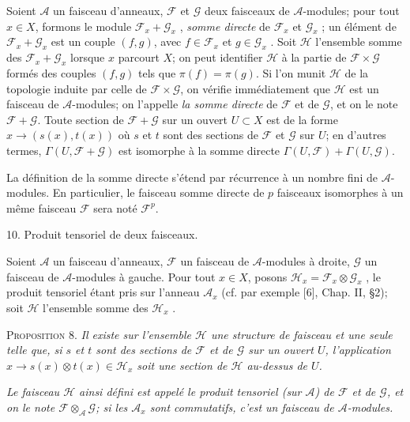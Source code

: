 Soient $\mathcal{A}$ un faisceau d'anneaux, $\mathcal{F}$ et $\mathcal{G}$ deux faisceaux de $\mathcal{A}$-modules; pour tout $x \in X$, formons le module $\mathcal{F}_x + \mathcal{G}_x$ , \textit{somme directe} de $\mathcal{F}_x$ et $\mathcal{G}_x$ ; un élément de $\mathcal{F}_x + \mathcal{G}_x$ est un couple $(f, g)$, avec $f \in \mathcal{F}_x$ et $g \in \mathcal{G}_x$ . Soit $\mathcal{H}$ l'ensemble somme des $\mathcal{F}_x + \mathcal{G}_x$ lorsque $x$ parcourt $X$; on peut identifier $\mathcal{H}$ à la partie de $\mathcal{F} \times \mathcal{G}$ formés des couples $(f, g)$ tels que $\pi(f) = \pi(g)$. Si l'on munit $\mathcal{H}$ de la topologie induite par celle de $\mathcal{F} \times \mathcal{G}$, on vérifie immédiatement que $\mathcal{H}$ est un faisceau de $\mathcal{A}$-modules; on l'appelle \textit{la somme directe} de $\mathcal{F}$ et de $\mathcal{G}$, et on le note $\mathcal{F} + \mathcal{G}$. Toute section de $\mathcal{F} + \mathcal{G}$ sur un ouvert $U \subset X$ est de la forme $x \to (s(x), t(x))$ où $s$ et $t$ sont des sections de $\mathcal{F}$ et $\mathcal{G}$ sur $U$; en d'autres termes, $\Gamma(U, \mathcal{F} + \mathcal{G})$ est isomorphe à la somme directe $\Gamma(U, \mathcal{F}) + \Gamma(U, \mathcal{G})$.

La définition de la somme directe s'étend par récurrence à un nombre fini de $\mathcal{A}$-modules. En particulier, le faisceau somme directe de $p$ faisceaux isomorphes à un même faisceau $\mathcal{F}$ sera noté $\mathcal{F}^p$.


10. Produit tensoriel de deux faisceaux.

Soient $\mathcal{A}$ un faisceau d'anneaux, $\mathcal{F}$ un faisceau de $\mathcal{A}$-modules à droite, $\mathcal{G}$ un faisceau de $\mathcal{A}$-modules à gauche. Pour tout $x \in X$, posons $\mathcal{H}_x = \mathcal{F}_x \otimes \mathcal{G}_x$ , le produit tensoriel étant pris sur l'anneau $\mathcal{A}_x$ (cf. par exemple [6], Chap. II, \S2); soit $\mathcal{H}$ l'ensemble somme des $\mathcal{H}_x$ .

\textsc{Proposition} 8. \textit{Il existe sur l'ensemble $\mathcal{H}$ une structure de faisceau et une seule telle que, si $s$ et $t$ sont des sections de $\mathcal{F}$ et de $\mathcal{G}$ sur un ouvert $U$, l'application $x \to s(x) \otimes t(x) \in \mathcal{H}_x$ soit une section de $\mathcal{H}$ au-dessus de $U$.}

\textit{Le faisceau $\mathcal{H}$ ainsi défini est appelé le produit tensoriel (sur $\mathcal{A}$) de $\mathcal{F}$ et de $\mathcal{G}$, et on le note $\mathcal{F} \otimes_{\mathcal{A}} \mathcal{G}$; si les $\mathcal{A}_x$ sont commutatifs, c'est un faisceau de $\mathcal{A}$-modules.}

